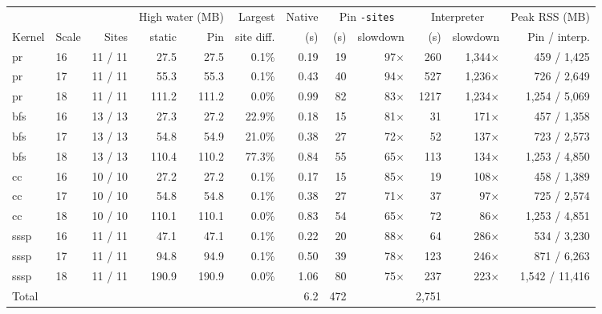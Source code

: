 \begin{tabular}{llrrrrrrrrrr}
\toprule
 & & & \multicolumn{2}{c}{High water (MB)} & Largest & Native & \multicolumn{2}{c}{Pin \texttt{-sites}} & \multicolumn{2}{c}{Interpreter} & Peak RSS (MB) \\
\cmidrule(lr){4-5}\cmidrule(lr){8-9}\cmidrule(lr){10-11}
Kernel & Scale & Sites & static & Pin & site diff. & (s) & (s) & slowdown & (s) & slowdown & Pin / interp. \\
\midrule
pr & 16 & 11 / 11 & 27.5 & 27.5 & 0.1\% & 0.19 & 19 & 97$\times$ & 260 & 1{,}344$\times$ & 459 / 1{,}425 \\
pr & 17 & 11 / 11 & 55.3 & 55.3 & 0.1\% & 0.43 & 40 & 94$\times$ & 527 & 1{,}236$\times$ & 726 / 2{,}649 \\
pr & 18 & 11 / 11 & 111.2 & 111.2 & 0.0\% & 0.99 & 82 & 83$\times$ & 1217 & 1{,}234$\times$ & 1{,}254 / 5{,}069 \\
bfs & 16 & 13 / 13 & 27.3 & 27.2 & 22.9\% & 0.18 & 15 & 81$\times$ & 31 & 171$\times$ & 457 / 1{,}358 \\
bfs & 17 & 13 / 13 & 54.8 & 54.9 & 21.0\% & 0.38 & 27 & 72$\times$ & 52 & 137$\times$ & 723 / 2{,}573 \\
bfs & 18 & 13 / 13 & 110.4 & 110.2 & 77.3\% & 0.84 & 55 & 65$\times$ & 113 & 134$\times$ & 1{,}253 / 4{,}850 \\
cc & 16 & 10 / 10 & 27.2 & 27.2 & 0.1\% & 0.17 & 15 & 85$\times$ & 19 & 108$\times$ & 458 / 1{,}389 \\
cc & 17 & 10 / 10 & 54.8 & 54.8 & 0.1\% & 0.38 & 27 & 71$\times$ & 37 & 97$\times$ & 725 / 2{,}574 \\
cc & 18 & 10 / 10 & 110.1 & 110.1 & 0.0\% & 0.83 & 54 & 65$\times$ & 72 & 86$\times$ & 1{,}253 / 4{,}851 \\
sssp & 16 & 11 / 11 & 47.1 & 47.1 & 0.1\% & 0.22 & 20 & 88$\times$ & 64 & 286$\times$ & 534 / 3{,}230 \\
sssp & 17 & 11 / 11 & 94.8 & 94.9 & 0.1\% & 0.50 & 39 & 78$\times$ & 123 & 246$\times$ & 871 / 6{,}263 \\
sssp & 18 & 11 / 11 & 190.9 & 190.9 & 0.0\% & 1.06 & 80 & 75$\times$ & 237 & 223$\times$ & 1{,}542 / 11{,}416 \\
\midrule
Total & & & & & & 6.2 & 472 & & 2{,}751 & & \\
\bottomrule
\end{tabular}
